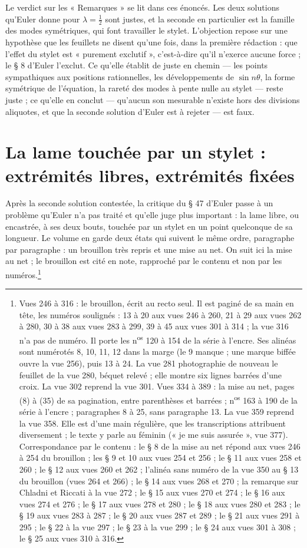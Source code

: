 \documentclass[11pt,a4paper]{article}
\begin{document}
Le verdict sur les « Remarques » se lit dans ces énoncés. Les deux solutions qu'Euler donne pour $\lambda=\frac12$ sont justes, et la seconde en particulier est la famille des modes symétriques, qui font travailler le stylet. L'objection repose sur une hypothèse que les feuillets ne disent qu'une fois, dans la première rédaction : que l'effet du stylet est « purement exclutif », c'est-à-dire qu'il n'exerce aucune force ; le § 8 d'Euler l'exclut. Ce qu'elle établit de juste en chemin — les points sympathiques aux positions rationnelles, les développements de $\sin n\theta$, la forme symétrique de l'équation, la rareté des modes à pente nulle au stylet — reste juste ; ce qu'elle en conclut — qu'aucun son mesurable n'existe hors des divisions aliquotes, et que la seconde solution d'Euler est à rejeter — est faux.

\section*{La lame touchée par un stylet : extrémités libres, extrémités fixées}

Après la seconde solution contestée, la critique du § 47 d'Euler passe à un problème qu'Euler n'a pas traité et qu'elle juge plus important : la lame libre, ou encastrée, à ses deux bouts, touchée par un stylet en un point quelconque de sa longueur. Le volume en garde deux états qui suivent le même ordre, paragraphe par paragraphe : un brouillon très repris et une mise au net. On suit ici la mise au net ; le brouillon est cité en note, rapproché par le contenu et non par les numéros.\footnote{Vues 246 à 316 : le brouillon, écrit au recto seul. Il est paginé de sa main en tête, les numéros soulignés : 13 à 20 aux vues 246 à 260, 21 à 29 aux vues 262 à 280, 30 à 38 aux vues 283 à 299, 39 à 45 aux vues 301 à 314 ; la vue 316 n'a pas de numéro. Il porte les n\textsuperscript{os} 120 à 154 de la série à l'encre. Ses alinéas sont numérotés 8, 10, 11, 12 dans la marge (le 9 manque ; une marque biffée ouvre la vue 256), puis 13 à 24. La vue 281 photographie de nouveau le feuillet de la vue 280, béquet relevé ; elle montre six lignes barrées d'une croix. La vue 302 reprend la vue 301. Vues 334 à 389 : la mise au net, pages (8) à (35) de sa pagination, entre parenthèses et barrées ; n\textsuperscript{os} 163 à 190 de la série à l'encre ; paragraphes 8 à 25, sans paragraphe 13. La vue 359 reprend la vue 358. Elle est d'une main régulière, que les transcriptions attribuent diversement ; le texte y parle au féminin (« je me suis assurée », vue 377). Correspondance par le contenu : le § 8 de la mise au net répond aux vues 246 à 254 du brouillon ; les § 9 et 10 aux vues 254 et 256 ; le § 11 aux vues 258 et 260 ; le § 12 aux vues 260 et 262 ; l'alinéa sans numéro de la vue 350 au § 13 du brouillon (vues 264 et 266) ; le § 14 aux vues 268 et 270 ; la remarque sur Chladni et Riccati à la vue 272 ; le § 15 aux vues 270 et 274 ; le § 16 aux vues 274 et 276 ; le § 17 aux vues 278 et 280 ; le § 18 aux vues 280 et 283 ; le § 19 aux vues 283 à 287 ; le § 20 aux vues 287 et 289 ; le § 21 aux vues 291 à 295 ; le § 22 à la vue 297 ; le § 23 à la vue 299 ; le § 24 aux vues 301 à 308 ; le § 25 aux vues 310 à 316.}
\end{document}
